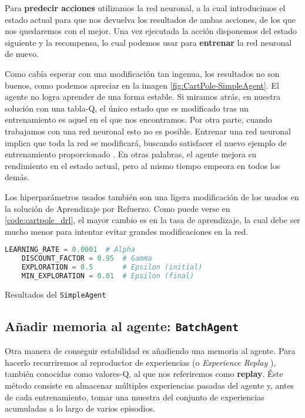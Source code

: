 Para \textbf{predecir acciones} utilizamos la red neuronal, a la cual introducimos el estado actual para que nos devuelva los resultados de ambas acciones, de los que nos quedaremos con el mejor. Una vez ejecutada la acción disponemos del estado siguiente y la recompensa, lo cual podemos usar para \textbf{entrenar} la red neuronal de nuevo.

Como cabía esperar con una modificación tan ingenua, los resultados no son buenos, como podemos apreciar en la imagen \ref{fig:CartPole-SimpleAgent}. El agente no logra aprender de una forma estable. Si miramos atrás, en nuestra solución con una tabla-Q, el único estado que es modificado tras un entrenamiento es aquel en el que nos encontramos. Por otra parte, cuando trabajamos con una red neuronal esto no es posible. Entrenar una red neuronal implica que toda la red se modificará, buscando satisfacer el nuevo ejemplo de entrenamiento proporcionado \citep[cap. 2]{Buduma:general}. En otras palabras, el agente mejora su rendimiento en el estado actual, pero al mismo tiempo empeora en todos los demás.

Los hiperparámetros usados también son una ligera modificación de los usados en la solución de Aprendizaje por Refuerzo. Como puede verse en \ref{code:cartpole_drl}, el mayor cambio es en la tasa de aprendizaje, la cual debe ser mucho menor para intentar evitar grandes modificaciones en la red.

\begin{minipage}{0.9\linewidth}%
    \begin{lstlisting}[frame=tb, language=Python, caption=Hiperparámetros, label=code:cartpole_drl]
    LEARNING_RATE = 0.0001  # Alpha
    DISCOUNT_FACTOR = 0.95  # Gamma
    EXPLORATION = 0.5       # Epsilon (initial)
    MIN_EXPLORATION = 0.01  # Epsilon (final)
    \end{lstlisting}%
\end{minipage}

%
       {Resultados del \texttt{SimpleAgent}}

\subsection{Añadir memoria al agente: \texttt{BatchAgent}}
\label{sec:cartpoledqn2}

Otra manera de conseguir estabilidad es añadiendo una memoria al agente. Para hacerlo recurriremos al reproductor de experiencias (o \textit{Experience Replay} \citep{Lin1992}), también conocidas como valores-Q, al que nos referiremos como \textbf{replay}. Éste método consiste en almacenar múltiples experiencias pasadas del agente y, antes de cada entrenamiento, tomar una muestra del conjunto de experiencias acumuladas a lo largo de varios episodios.

